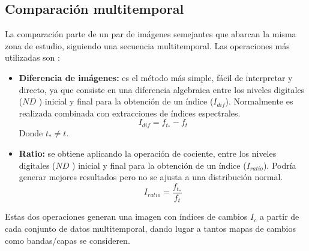 \subsection{Comparaci\'on multitemporal}\label{subsec:compMult}
La comparaci\'on parte de un par de im\'agenes semejantes que abarcan la misma zona de estudio, siguiendo una secuencia multitemporal. Las operaciones m\'as utilizadas son \cite{chuvieco1998factor}: 
	\begin{itemize}
		\item \textbf{Diferencia de im\'agenes:} es el m\'etodo m\'as simple, f\'acil de interpretar y directo, ya que consiste en una diferencia algebraica entre los niveles digitales ($ ND $ ) inicial y final para la obtenci\'on de un \'indice ($ I_{dif} $). Normalmente es realizada combinada  con extracciones de \'indices espectrales.
								\begin{equation}
								I_{dif} = f_{t_{*}}-f_{t}
								\end{equation} 	
		Donde $ t_{*} \neq t $.
				\item \textbf{Ratio:} se obtiene aplicando la operaci\'on de cociente, entre los niveles digitales ($ ND $ ) inicial y final para la obtenci\'on de un \'indice ($ I_{ratio} $). Podr\'ia  generar mejores resultados pero no se ajusta a una distribuci\'on normal.
										\begin{equation}
										I_{ratio} = \dfrac{f_{t_{*}}}{f_{t}}
										\end{equation} 	

		\end{itemize}
Estas dos operaciones generan una imagen con \'indices de cambios $ I_{c} $ a partir de cada conjunto de datos multitemporal, dando lugar a tantos mapas de cambios como bandas/capas se consideren.
